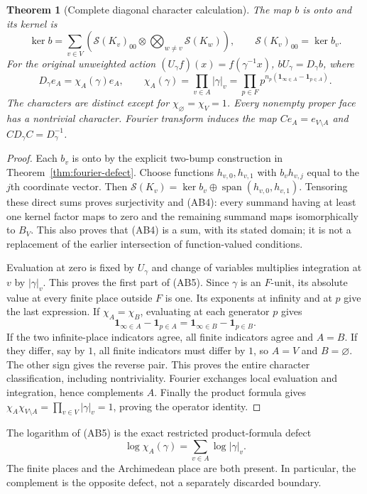 \documentclass[11pt,a4paper]{article}
\newtheorem{theorem}{Theorem}[section]
\theoremstyle{definition}\newtheorem{definition}[theorem]{Definition}
\newcommand{\Sch}{\mathcal S}\newcommand{\im}{\operatorname{im}}
\begin{document}
\begin{theorem}[Complete diagonal character calculation]\label{thm:boundary-characters}
The map $b$ is onto and its kernel is
\[
 \ker b=\sum_{v\in V}
 \left(\Sch(K_v)_{00}\otimes\bigotimes_{w\ne v}\Sch(K_w)\right),
 \qquad \Sch(K_v)_{00}=\ker b_v.
 \tag{AB4}
\]
For the original unweighted action $(U_\gamma f)(x)=f(\gamma^{-1}x)$,
$bU_\gamma=D_\gamma b$, where
\[
 D_\gamma e_A=\chi_A(\gamma)e_A,\qquad
 \chi_A(\gamma)=\prod_{v\in A}|\gamma|_v
 =\prod_{p\in F}p^{n_p(\mathbf1_{\infty\in A}-\mathbf1_{p\in A})}.
 \tag{AB5}
\]
The characters are distinct except for
$\chi_\varnothing=\chi_V=1$. Every nonempty proper face has a nontrivial
character. Fourier transform induces the map $C e_A=e_{V\setminus A}$ and
$C D_\gamma C=D_\gamma^{-1}$.
\end{theorem}
\begin{proof}
Each $b_v$ is onto by the explicit two-bump construction in
Theorem~\ref{thm:fourier-defect}. Choose functions $h_{v,0},h_{v,1}$ with
$b_vh_{v,j}$ equal to the $j$th coordinate vector. Then
$\Sch(K_v)=\ker b_v\oplus\operatorname{span}(h_{v,0},h_{v,1})$.
Tensoring these direct sums proves surjectivity and (AB4): every summand
having at least one kernel factor maps to zero and the remaining summand maps
isomorphically to $B_V$. This also proves that (AB4) is a sum, with its stated
domain; it is not a replacement of the earlier intersection of function-valued
conditions.

Evaluation at zero is fixed by $U_\gamma$ and change of variables multiplies
integration at $v$ by $|\gamma|_v$. This proves the first part of (AB5).
Since $\gamma$ is an $F$-unit, its absolute value at every finite place outside
$F$ is one. Its exponents at infinity and at $p$ give the last expression.
If $\chi_A=\chi_B$, evaluating at each generator $p$ gives
\[
 \mathbf1_{\infty\in A}-\mathbf1_{p\in A}
 =\mathbf1_{\infty\in B}-\mathbf1_{p\in B}.
 \tag{AB6}
\]
If the two infinite-place indicators agree, all finite indicators agree and
$A=B$. If they differ, say by $1$, all finite indicators must differ by $1$,
so $A=V$ and $B=\varnothing$. The other sign gives the reverse pair.
This proves the entire character classification, including nontriviality.
Fourier exchanges local evaluation and integration, hence complements $A$.
Finally the product formula gives
$\chi_A\chi_{V\setminus A}=\prod_{v\in V}|\gamma|_v=1$,
proving the operator identity.
\end{proof}

The logarithm of (AB5) is the exact restricted product-formula defect
\[
 \log\chi_A(\gamma)=\sum_{v\in A}\log|\gamma|_v.
 \tag{AB7}
\]
The finite places and the Archimedean place are both present. In particular,
the complement is the opposite defect, not a separately discarded boundary.
\end{document}
